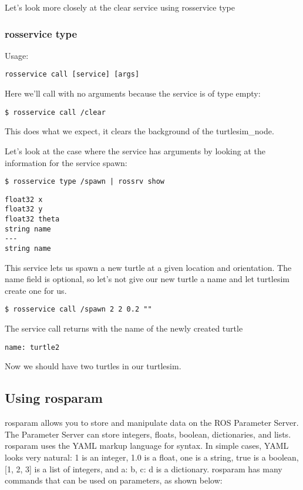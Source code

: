 Let's look more closely at the clear service using rosservice type

\subsubsection{rosservice type}
Usage:

\begin{lstlisting}[breaklines=true languages=bash]
rosservice call [service] [args]
\end{lstlisting}

Here we'll call with no arguments because the service is of type empty:

\begin{lstlisting}[breaklines=true languages=bash]
$ rosservice call /clear
\end{lstlisting}

This does what we expect, it clears the background of the turtlesim\_node.

Let's look at the case where the service has arguments by looking at the information for the service spawn:

\begin{lstlisting}[breaklines=true languages=bash]
$ rosservice type /spawn | rossrv show
\end{lstlisting}

\begin{lstlisting}[breaklines=true languages=bash]
float32 x
float32 y
float32 theta
string name
---
string name
\end{lstlisting}

This service lets us spawn a new turtle at a given location and orientation. The name field is optional, so let's not give our new turtle a name and let turtlesim create one for us.

\begin{lstlisting}[breaklines=true languages=bash]
$ rosservice call /spawn 2 2 0.2 ""
\end{lstlisting}

The service call returns with the name of the newly created turtle
\begin{lstlisting}[breaklines=true languages=bash]
name: turtle2
\end{lstlisting}

Now we should have two turtles in our turtlesim.

\subsection{Using rosparam}
rosparam allows you to store and manipulate data on the ROS Parameter Server. The Parameter Server can store integers, floats, boolean, dictionaries, and lists. rosparam uses the YAML markup language for syntax. In simple cases, YAML looks very natural: 1 is an integer, 1.0 is a float, one is a string, true is a boolean, [1, 2, 3] is a list of integers, and {a: b, c: d} is a dictionary. rosparam has many commands that can be used on parameters, as shown below:

